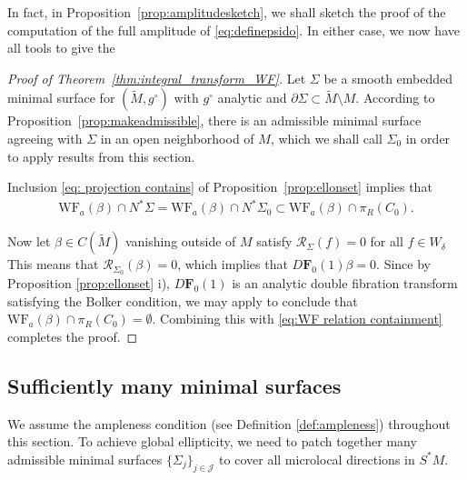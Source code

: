 \documentclass[11pt]{amsart}
\theoremstyle{definition}
\numberwithin{equation}{section}
\newcommand{\p}{\partial}
\begin{document}
In fact, in Proposition~\ref{prop:amplitudesketch}, we shall sketch the proof of the computation of the full amplitude of \eqref{eq:definepsido}. In either case, we now have all tools to give the 

\begin{proof}[Proof of Theorem~\ref{thm:integral_transform_WF}]
    Let $\Sigma$ be a smooth embedded minimal surface for $(\widetilde{M},g^\circ)$ with $g^\circ$ analytic and $\p\Sigma\subset \widetilde{M}\setminus M$. According to Proposition~\ref{prop:makeadmissible}, there is an admissible minimal surface agreeing with $\Sigma$ in an open neighborhood of $M$, which we shall call $\Sigma_0$ in order to apply results from this section.


Inclusion \eqref{eq: projection contains}  of Proposition~\ref{prop:ellonset} implies that 
    \begin{eqnarray}\label{eq:WF relation containment}
            \mathrm{WF}_a(\beta)\cap N^\ast \Sigma = \mathrm{WF}_a(\beta)\cap N^\ast \Sigma_0\subset \mathrm{WF}_a(\beta)\cap\pi_R(C_0).
    \end{eqnarray}

    Now let $\beta\in C(\widetilde{M})$ vanishing outside of $M$ satisfy $\mathcal{R}_\Sigma(f) = 0$ for all $f\in W_\delta$ This means that $\mathcal{R}_{\Sigma_0}(\beta)=0$, which implies that $D\mathbf{F}_0(1)\beta = 0$. Since by Proposition \ref{prop:ellonset} i), $D\mathbf{F}_0(1)$ is an analytic double fibration transform satisfying the Bolker condition, we may apply \cite[Thm.~1.2]{MST} to conclude that $\mathrm{WF}_a(\beta)\cap\pi_R(C_0) =\emptyset$. Combining this with \eqref{eq:WF relation containment} completes the proof.
\end{proof}






\subsection{Sufficiently many minimal surfaces}\label{sec:suffsurf}

We assume the ampleness condition (see Definition \ref{def:ampleness}) throughout this section.
To achieve global ellipticity, we need to patch together many admissible minimal surfaces $\{\Sigma_j\}_{j\in \mathcal J}$ to cover all microlocal directions in $S^\ast M$. 
\end{document}
